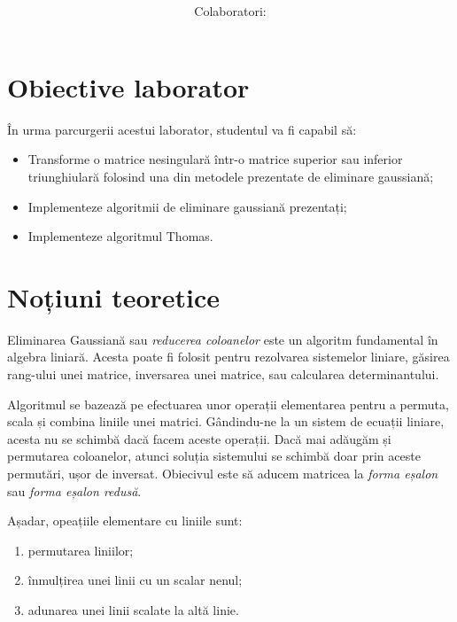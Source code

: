 \documentclass{exam}
\title{
	\textmd{\textbf{\MNLabTitle}}
	\author{Colaboratori: \MNAuthor}
}
\begin{document}
\begin{coverpages}

	\maketitle
	\tableofcontents

\end{coverpages}

\section{Obiective laborator}

\par În urma parcurgerii acestui laborator, studentul va fi capabil să:
\begin{itemize}
	\item Transforme o matrice nesingulară într-o matrice superior sau inferior triunghiulară folosind una din metodele prezentate de eliminare gaussiană;
	\item Implementeze algoritmii de eliminare gaussiană prezentați;
	\item Implementeze algoritmul Thomas.
\end{itemize}

\section{Noțiuni teoretice}

\par Eliminarea Gaussiană sau \textit{reducerea coloanelor} este un algoritm
fundamental în algebra liniară. Acesta poate fi folosit pentru rezolvarea
sistemelor liniare, găsirea rang-ului unei matrice, inversarea unei matrice,
sau calcularea determinantului.

\par Algoritmul se bazează pe efectuarea unor operații elementarea pentru a
permuta, scala și combina liniile unei matrici. Gândindu-ne la un sistem de
ecuații liniare, acesta nu se schimbă dacă facem aceste operații. Dacă mai
adăugăm și permutarea coloanelor, atunci soluția sistemului se schimbă doar prin
aceste permutări, ușor de inversat. Obiecivul este să aducem matricea la
\textit{forma eșalon} sau \textit{forma eșalon redusă}.

\par Așadar, opeațiile elementare cu liniile sunt:

\begin{enumerate}
	\item permutarea liniilor;
	\item înmulțirea unei linii cu un scalar nenul;
	\item adunarea unei linii scalate la altă linie.
\end{enumerate}
\end{document}
